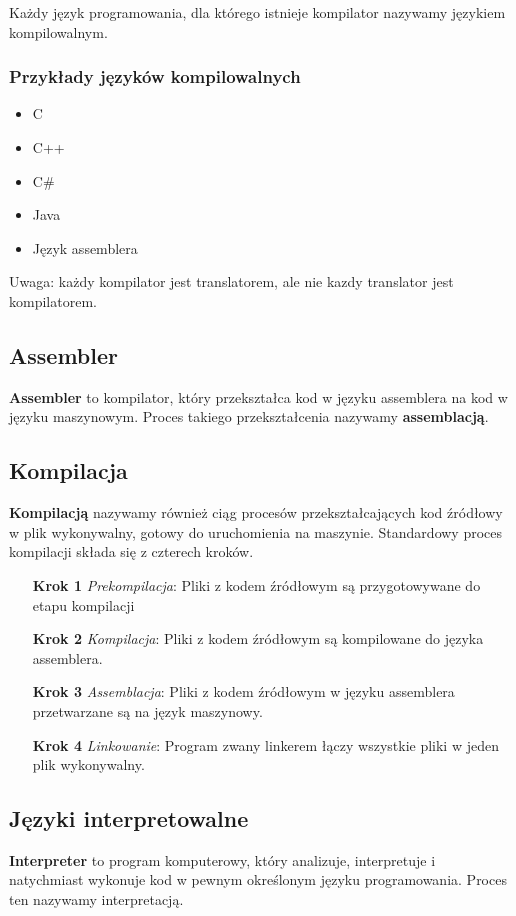 \documentclass[a4paper]{article}
\begin{document}
Każdy język programowania, dla którego istnieje kompilator nazywamy językiem kompilowalnym.
\subsubsection{Przykłady języków kompilowalnych}
\begin{itemize}
    \item C
    \item C++
    \item C\#
    \item Java
    \item Język assemblera
\end{itemize}
Uwaga: każdy kompilator jest translatorem, ale nie kazdy translator jest kompilatorem.
\subsection{Assembler}
\textbf{Assembler} to kompilator, który przekształca kod w języku assemblera na kod w języku maszynowym. Proces takiego przekształcenia nazywamy \textbf{assemblacją}.
\subsection{Kompilacja}
\textbf{Kompilacją} nazywamy również ciąg procesów przekształcających kod źródłowy w plik wykonywalny, gotowy do uruchomienia na maszynie. Standardowy proces kompilacji składa się z czterech kroków.
\begin{enumerate}
    \item[\textbf{Krok 1}]\emph{Prekompilacja}: Pliki z kodem źródłowym są przygotowywane do etapu kompilacji
    \item[\textbf{Krok 2}]\emph{Kompilacja}: Pliki z kodem źródłowym są kompilowane do języka assemblera.
    \item[\textbf{Krok 3}]\emph{Assemblacja}: Pliki z kodem źródłowym w języku assemblera przetwarzane są na język maszynowy.
    \item[\textbf{Krok 4}]\emph{Linkowanie}: Program zwany linkerem łączy wszystkie pliki w jeden plik wykonywalny.
\end{enumerate}
\pagebreak
\subsection{Języki interpretowalne}
\textbf{Interpreter} to program komputerowy, który analizuje, interpretuje i natychmiast wykonuje kod w pewnym określonym języku programowania. Proces ten nazywamy interpretacją.
\end{document}
